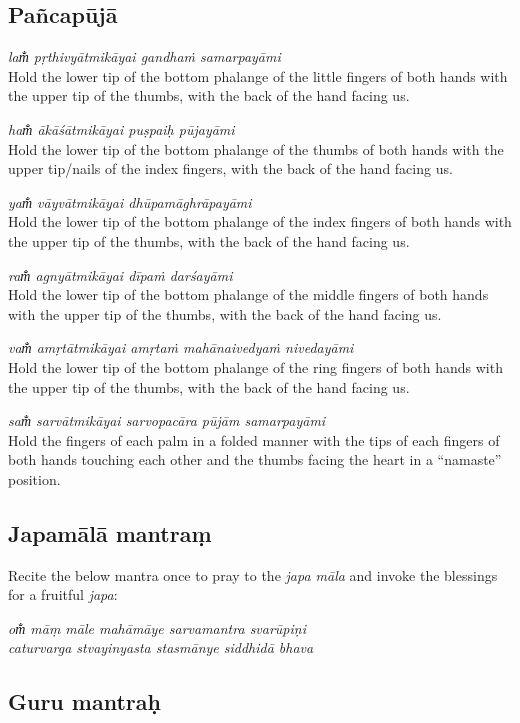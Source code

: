 \documentclass[12pt,oneside,a4paper]{article}
\newenvironment{shloka}[1]
  {\bigskip\center#1\varwidth{\linewidth}}
  {\endvarwidth\endcenter\bigskip}
\newcommand{\tl}[1]{\emph{#1}}
\begin{document}
\subsection{Pañcapūjā}

\tl{lam̐ pṛthivyātmikāyai gandhaṁ samarpayāmi}\\
Hold the lower tip of the bottom phalange of the little fingers of both hands
with the upper tip of the thumbs, with the back of the hand facing us.

\tl{ham̐ ākāśātmikāyai puṣpaiḥ pūjayāmi}\\
Hold the lower tip of the bottom phalange of the thumbs of both hands with
the upper tip/nails of the index fingers, with the back of the hand facing us.

\tl{yam̐ vāyvātmikāyai dhūpamāghrāpayāmi}\\
Hold the lower tip of the bottom phalange of the index fingers of both hands
with the upper tip of the thumbs, with the back of the hand facing us.

\tl{ram̐ agnyātmikāyai dīpaṁ darśayāmi}\\
Hold the lower tip of the bottom phalange of the middle fingers of both hands
with the upper tip of the thumbs, with the back of the hand facing us.

\tl{vam̐ amṛtātmikāyai amṛtaṁ mahānaivedyaṁ nivedayāmi}\\
Hold the lower tip of the bottom phalange of the ring fingers of both hands
with the upper tip of the thumbs, with the back of the hand facing us.

\tl{sam̐ sarvātmikāyai sarvopacāra pūjām samarpayāmi}\\
Hold the fingers of each palm in a folded manner with the tips of each fingers
of both hands touching each other and the thumbs facing the heart in
a ``namaste'' position.

\subsection{Japamālā mantraṃ}

Recite the below mantra once to pray to the \tl{japa māla} and invoke
the blessings for a fruitful \tl{japa}:

\begin{shloka}\itshape
  om̐ māṃ māle mahāmāye sarvamantra svarūpiṇi\\
  caturvarga stvayinyasta stasmānye siddhidā bhava
\end{shloka}

\subsection{Guru mantraḥ}
\end{document}
